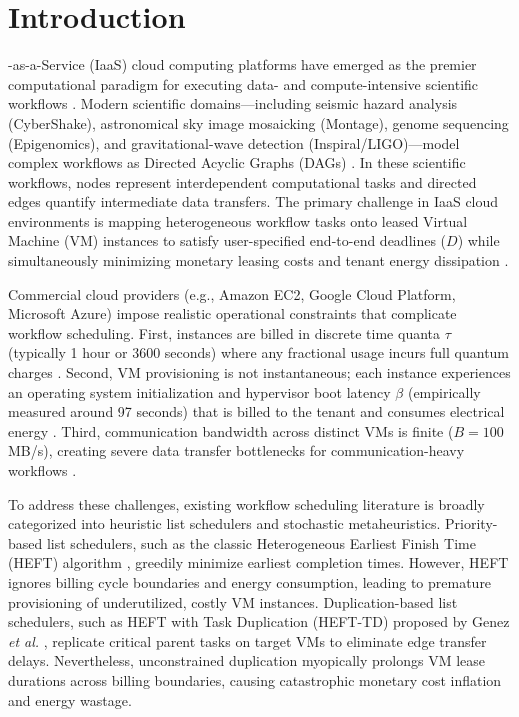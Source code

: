 \documentclass[journal]{IEEEtran}
\begin{document}
\section{Introduction}
-as-a-Service (IaaS) cloud computing platforms have emerged as the premier computational paradigm for executing data- and compute-intensive scientific workflows \cite{topcuoglu2002heft, pegasus2015}. Modern scientific domains---including seismic hazard analysis (CyberShake), astronomical sky image mosaicking (Montage), genome sequencing (Epigenomics), and gravitational-wave detection (Inspiral/LIGO)---model complex workflows as Directed Acyclic Graphs (DAGs) \cite{pegasus2015, genez2018heft}. In these scientific workflows, nodes represent interdependent computational tasks and directed edges quantify intermediate data transfers. The primary challenge in IaaS cloud environments is mapping heterogeneous workflow tasks onto leased Virtual Machine (VM) instances to satisfy user-specified end-to-end deadlines ($D$) while simultaneously minimizing monetary leasing costs and tenant energy dissipation \cite{rodriguez2014cost, ceas2018li}.

Commercial cloud providers (e.g., Amazon EC2, Google Cloud Platform, Microsoft Azure) impose realistic operational constraints that complicate workflow scheduling. First, instances are billed in discrete time quanta $\tau$ (typically 1 hour or 3600 seconds) where any fractional usage incurs full quantum charges \cite{rodriguez2014cost}. Second, VM provisioning is not instantaneous; each instance experiences an operating system initialization and hypervisor boot latency $\beta$ (empirically measured around 97 seconds) that is billed to the tenant and consumes electrical energy \cite{rodriguez2014cost, ceas2018li}. Third, communication bandwidth across distinct VMs is finite ($B = 100$ MB/s), creating severe data transfer bottlenecks for communication-heavy workflows \cite{genez2018heft}.

To address these challenges, existing workflow scheduling literature is broadly categorized into heuristic list schedulers and stochastic metaheuristics. Priority-based list schedulers, such as the classic Heterogeneous Earliest Finish Time (HEFT) algorithm \cite{topcuoglu2002heft}, greedily minimize earliest completion times. However, HEFT ignores billing cycle boundaries and energy consumption, leading to premature provisioning of underutilized, costly VM instances. Duplication-based list schedulers, such as HEFT with Task Duplication (HEFT-TD) proposed by Genez \textit{et al.} \cite{genez2018heft}, replicate critical parent tasks on target VMs to eliminate edge transfer delays. Nevertheless, unconstrained duplication myopically prolongs VM lease durations across billing boundaries, causing catastrophic monetary cost inflation and energy wastage.
\end{document}

